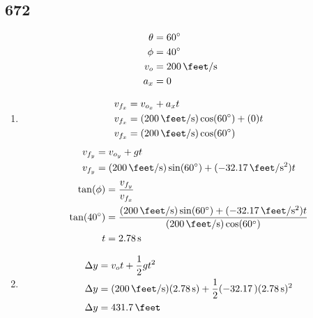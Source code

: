\documentclass{article}
\begin{document}
\subsection{672}
\begin{align*}
	\theta & = \SI{60}{\degree} \\
	\phi & = \SI{40}{\degree} \\
	v_o & = \SI{200}{\feet \per \second} \\
	a_x & = 0
\end{align*}
\begin{enumerate}[label=\textbf{(\alph*)}]
	\item
		\begin{align*}
			v_{f_x} & = v_{o_x} + a_xt \\
			v_{f_x} & = (\SI{200}{\feet \per \second})\cos(\SI{60}{\degree}) + (0)t \\
			v_{f_x} & = (\SI{200}{\feet \per \second})\cos(\SI{60}{\degree})
		\end{align*}
		\begin{align*}
			v_{f_y} & = v_{o_y} + gt \\
			v_{f_y} & = (\SI{200}{\feet \per \second})\sin(\SI{60}{\degree}) + (-\SI{32.17}{\feet \per \second \squared})t
		\end{align*}
		\begin{align*}
			\tan(\phi) & = \frac{v_{f_y}}{v_{f_x}} \\
			\tan(\SI{40}{\degree}) & = \frac{(\SI{200}{\feet \per \second})\sin(\SI{60}{\degree}) + (-\SI{32.17}{\feet \per \second \squared})t}{(\SI{200}{\feet \per \second})\cos(\SI{60}{\degree})} \\
			t & = \SI{2.78}{\second}
		\end{align*}
	\item
		\begin{align*}
			\Delta y & = v_ot + \frac{1}{2}gt^2 \\
			\Delta y & = (\SI{200}{\feet \per \second})(\SI{2.78}{\second}) + \frac{1}{2}(-\SI{32.17})(\SI{2.78}{\second})^2 \\
			\Delta y & = \SI{431.7}{\feet}
		\end{align*}
\end{enumerate}
\end{document}
